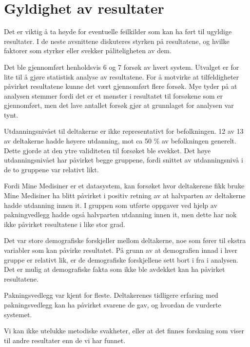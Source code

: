 \section{Gyldighet av resultater}
Det er viktig å ta høyde for eventuelle feilkilder som kan ha ført til ugyldige resultater. I de neste avsnittene diskuteres styrken på resultatene, og hvilke faktorer som styrker eller svekker påliteligheten av dem. 

Det ble gjennomført henholdsvis 6 og 7 forsøk av hvert system. Utvalget er for lite til å gjøre statistisk analyse av resultatene. For å motvirke at tilfeldigheter påvirket resultatene kunne det vært gjennomført flere forsøk. Mye tyder på at analysen stemmer fordi det er et mønster i resultatet til forsøkene som er gjennomført, men det lave antallet forsøk gjør at grunnlaget for analysen var tynt. 

Utdanningsnivået til deltakerne er ikke representativt for befolkningen. 12 av 13 av deltakerne hadde høyere utdanning, mot ca 50 \% av befolkningen generelt. Dette gjorde at den ytre validiteten til forsøket ble svekket. Det høye utdanningsnivået har påvirket begge gruppene, fordi snittet av utdanningsnivå i de to gruppene var relativt likt. 

Fordi Mine Medisiner er et datasystem, kan forsøket hvor deltakerene fikk bruke Mine Medisiner ha blitt påvirket i positiv retning av at halvparten av deltakerne hadde utdanning innen \acrshort{it}. I gruppen som utførte oppgaver ved hjelp av pakningvedlegg hadde også halvparten utdanning innen \acrshort{it}, men dette har nok ikke påvirket resultatene i like stor grad. 

Det var store demografiske forskjeller mellom deltakerne, noe som fører til ekstra variabler som kan påvirke resultatet. På grunn av at demografien innad i hver gruppe er relativt lik, er de demografiske forskjellene sett bort i fra i analysen. Det er mulig at demografiske fakta som ikke ble avdekket kan ha påvirket resultatene. 

Pakningsvedlegg var kjent for fleste. Deltakerenes tidligere erfaring med pakningsvedlegg kan ha påvirket svarene de gav, og hvordan de vurderte systemet. 

Vi kan ikke utelukke metodiske svakheter, eller at det finnes forskning som viser til andre resultater enn de vi har funnet.